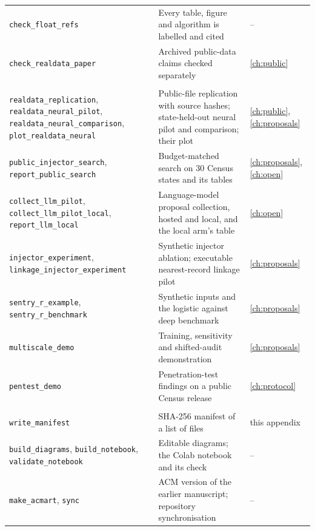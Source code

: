 \begin{table}[ht]
\begin{tabular}{@{}>{\raggedright\arraybackslash}p{4.6cm}>{\raggedright\arraybackslash}p{7.6cm}>{\raggedright\arraybackslash}p{2.2cm}@{}}
\texttt{check\_\allowbreak{}float\_\allowbreak{}refs} & Every table, figure and algorithm is labelled and cited
& -- \\
\texttt{check\_\allowbreak{}realdata\_\allowbreak{}paper} & Archived public-data claims checked separately &
\ref{ch:public} \\
\addlinespace
\multicolumn{3}{@{}l}{\emph{Public files and model-proposed attacks}}\\
\texttt{realdata\_\allowbreak{}replication}, \texttt{realdata\_\allowbreak{}neural\_\allowbreak{}pilot},
\texttt{realdata\_\allowbreak{}neural\_\allowbreak{}comparison}, \texttt{plot\_\allowbreak{}realdata\_\allowbreak{}neural} &
Public-file replication with source hashes; state-held-out neural pilot and
comparison; their plot & \ref{ch:public}, \ref{ch:proposals} \\
\texttt{public\_\allowbreak{}injector\_\allowbreak{}search}, \texttt{report\_\allowbreak{}public\_\allowbreak{}search} & Budget-matched
search on 30 Census states and its tables & \ref{ch:proposals}, \ref{ch:open} \\
\texttt{collect\_\allowbreak{}llm\_\allowbreak{}pilot}, \texttt{collect\_\allowbreak{}llm\_\allowbreak{}pilot\_\allowbreak{}local},
\texttt{report\_\allowbreak{}llm\_\allowbreak{}local} & Language-model proposal collection, hosted and local, and
the local arm's table & \ref{ch:open} \\
\texttt{injector\_\allowbreak{}experiment}, \texttt{linkage\_\allowbreak{}injector\_\allowbreak{}experiment} & Synthetic
injector ablation; executable nearest-record linkage pilot & \ref{ch:proposals} \\
\texttt{sentry\_\allowbreak{}r\_\allowbreak{}example}, \texttt{sentry\_\allowbreak{}r\_\allowbreak{}benchmark} & Synthetic inputs and the
logistic against deep benchmark & \ref{ch:proposals} \\
\texttt{multiscale\_\allowbreak{}demo} & Training, sensitivity and shifted-audit demonstration &
\ref{ch:proposals} \\
\texttt{pentest\_\allowbreak{}demo} & Penetration-test findings on a public Census release &
\ref{ch:protocol} \\
\addlinespace
\multicolumn{3}{@{}l}{\emph{Housekeeping}}\\
\texttt{write\_\allowbreak{}manifest} & SHA-256 manifest of a list of files & this appendix \\
\texttt{build\_\allowbreak{}diagrams}, \texttt{build\_\allowbreak{}notebook}, \texttt{validate\_\allowbreak{}notebook} &
Editable diagrams; the Colab notebook and its check & -- \\
\texttt{make\_\allowbreak{}acmart}, \texttt{sync} & ACM version of the earlier manuscript;
repository synchronisation & -- \\
\bottomrule
\end{tabular}
\end{table}

